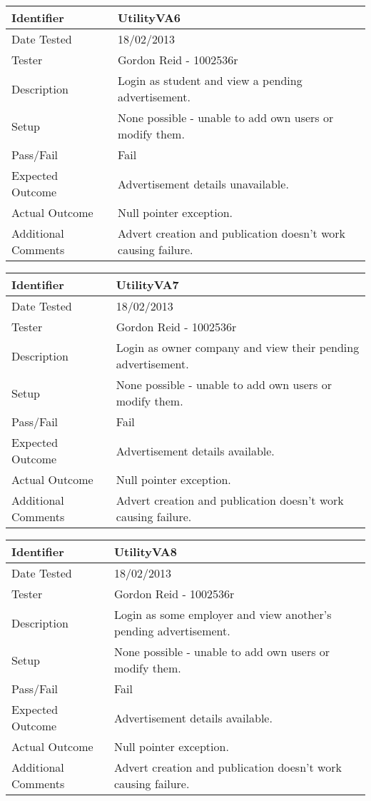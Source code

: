\begin{tabularx}{\textwidth}{|T|L|}
\hline
Identifier & UtilityVA6\\
\hline
Date Tested & 18/02/2013\\
\hline
Tester & Gordon Reid - 1002536r\\
\hline
Description & Login as student and view a pending advertisement.\\
\hline
Setup & None possible - unable to add own users or modify them.\\
\hline
Pass/Fail & Fail\\
\hline
Expected Outcome & Advertisement details unavailable.\\
\hline
Actual Outcome & Null pointer exception.\\
\hline
Additional Comments & Advert creation and publication doesn't work causing
failure.\\
\hline
\end{tabularx}

\vspace{2em}

\begin{tabularx}{\textwidth}{|T|L|}
\hline
Identifier & UtilityVA7\\
\hline
Date Tested & 18/02/2013\\
\hline
Tester & Gordon Reid - 1002536r\\
\hline
Description & Login as owner company and view their pending advertisement.\\
\hline
Setup & None possible - unable to add own users or modify them.\\
\hline
Pass/Fail & Fail\\
\hline
Expected Outcome & Advertisement details available.\\
\hline
Actual Outcome & Null pointer exception.\\
\hline
Additional Comments & Advert creation and publication doesn't work causing
failure.\\
\hline
\end{tabularx}

\vspace{2em}

\begin{tabularx}{\textwidth}{|T|L|}
\hline
Identifier & UtilityVA8\\
\hline
Date Tested & 18/02/2013\\
\hline
Tester & Gordon Reid - 1002536r\\
\hline
Description & Login as some employer and view another's pending advertisement.\\
\hline
Setup & None possible - unable to add own users or modify them.\\
\hline
Pass/Fail & Fail\\
\hline
Expected Outcome & Advertisement details available.\\
\hline
Actual Outcome & Null pointer exception.\\
\hline
Additional Comments & Advert creation and publication doesn't work causing
failure.\\
\hline
\end{tabularx}


